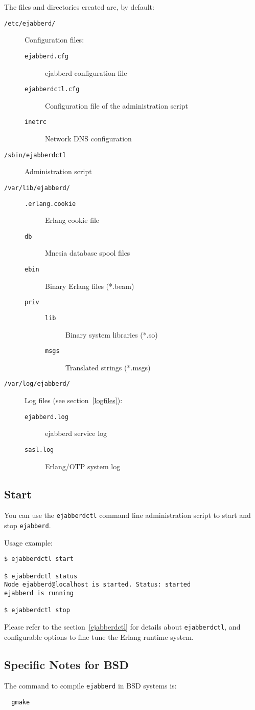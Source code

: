 \documentclass[a4paper,10pt]{book}
\newcommand{\ind}[1]{\begin{latexonly}\index{#1}\end{latexonly}}
\newcommand{\bracehack}{\def\{{\char"7B}\def\}{\char"7D}}
\newcommand{\titem}[1]{\item[\bracehack\texttt{#1}]}
\newcommand{\term}[1]{\texttt{#1}}
\newcommand{\ejabberd}{\texttt{ejabberd}}
\begin{document}
The files and directories created are, by default:
\begin{description}
	\titem{/etc/ejabberd/} Configuration files:
		\begin{description}
			\titem{ejabberd.cfg} ejabberd configuration file
			\titem{ejabberdctl.cfg} Configuration file of the administration script
			\titem{inetrc} Network DNS configuration
		\end{description}
	\titem{/sbin/ejabberdctl} Administration script
	\titem{/var/lib/ejabberd/}
		\begin{description}
			\titem{.erlang.cookie} Erlang cookie file
			\titem{db} Mnesia database spool files
			\titem{ebin} Binary Erlang files (*.beam)
			\titem{priv}
				\begin{description}
					\titem{lib} Binary system libraries (*.so)
					\titem{msgs} Translated strings (*.msgs)
				\end{description}
		\end{description}
	\titem{/var/log/ejabberd/} Log files (see section~\ref{logfiles}):
		\begin{description}
			\titem{ejabberd.log} ejabberd service log
			\titem{sasl.log} Erlang/OTP system log
		\end{description}
\end{description}


\subsection{Start}
\label{start}
\ind{install!start}

You can use the \term{ejabberdctl} command line administration script to start and stop \ejabberd{}.

Usage example:
\begin{verbatim}
$ ejabberdctl start

$ ejabberdctl status
Node ejabberd@localhost is started. Status: started
ejabberd is running

$ ejabberdctl stop
\end{verbatim}
Please refer to the section~\ref{ejabberdctl} for details about \term{ejabberdctl},
and configurable options to fine tune the Erlang runtime system.

\subsection{Specific Notes for BSD}
\label{bsd}
\ind{install!bsd}

The command to compile \ejabberd{} in BSD systems is:
\begin{verbatim}
  gmake
\end{verbatim}
\end{document}
